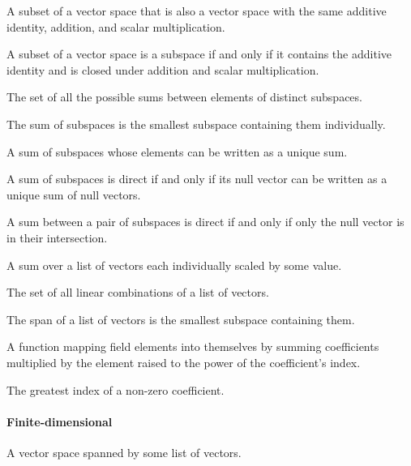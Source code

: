 \pagebreak

\begin{multicols}{3}

  A subset of a vector space that is also a vector space with the same additive identity, addition, and scalar multiplication.
  
  A subset of a vector space is a subspace if and only if it contains the additive identity and is closed under addition and scalar multiplication.

  The set of all the possible sums between elements of distinct subspaces.
  
  The sum of subspaces is the smallest subspace containing them individually.
  
  A sum of subspaces whose elements can be written as a unique sum.
  
  A sum of subspaces is direct if and only if its null vector can be written as a unique sum of null vectors.

  A sum between a pair of subspaces is direct if and only if only the null vector is in their intersection.

  A sum over a list of vectors each individually scaled by some value.
  
  The set of all linear combinations of a list of vectors.
  
  The span of a list of vectors is the smallest subspace containing them.

  A function mapping field elements into themselves by summing coefficients multiplied by the element raised to the power of the coefficient's index.
  
  The greatest index of a non-zero coefficient.
  
  \paragraph{\textbf{Finite-dimensional}}
  A vector space spanned by some list of vectors.

\end{multicols}
